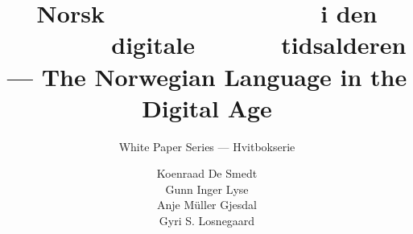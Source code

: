 %                                                                             
%
%
% 

\usepackage{polyglossia}
\newcommand{\bokmaal}[1]{#1} %
\newcommand{\nynorsk}[1]{} %


\title{Norsk \ \ \ \ \ \ \ \ \ \ \ \ \ \ \ \  i den \ \ \ \ \ \ \ \  digitale \ \ \ \ \ \ tidsalderen --- The Norwegian Language in the Digital Age}



\subtitle{\bokmaal{White Paper Series --- Hvitbokserie}\nynorsk{White Paper Series --- Kvitbokserie}}

\author{
  Koenraad De Smedt\\
  Gunn Inger Lyse\\
  Anje Müller Gjesdal\\
  Gyri S. Losnegaard
}


